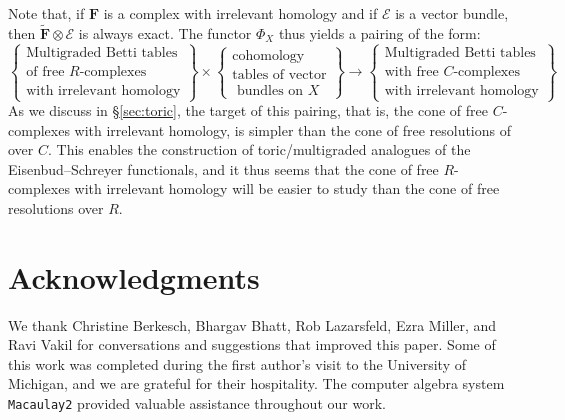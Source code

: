 \documentclass[12pt]{amsart}
\theoremstyle{definition}
\theoremstyle{remark}
\newcommand{\cE}{\mathcal{E}}
\newcommand{\FF}{\mathbf{F}}
\begin{document}
Note that, if  $\FF$ is a complex with irrelevant homology and if $\cE$ is a vector bundle, then $\widetilde{\FF}\otimes \cE$ is always exact.
The functor $\Phi_{X}$ thus yields a pairing of the form:
\begin{equation*}%
\label{eqn:multipairing}
%
\left\{\begin{matrix}
\text{Multigraded Betti tables} \\ \text{of free $R$-complexes}\\
\text{with irrelevant homology}\end{matrix}\right\}
%
\times 
%
\left\{\begin{matrix}
\text{cohomology }\\
\text{tables of vector}\\
\text{ bundles on } X
\end{matrix}\right\}
%
\longrightarrow
\left\{\begin{matrix}
\text{Multigraded Betti tables} \\ \text{with  free $C$-complexes}\\
\text{with irrelevant homology}
\end{matrix}\right\}
\end{equation*}
As we discuss in \S\ref{sec:toric}, the target of this pairing, that is, the cone of free $C$-complexes with irrelevant homology, is simpler than the cone of free resolutions of over $C$.  This enables the construction of toric/multigraded analogues of the Eisenbud--Schreyer functionals, and it thus seems that the cone of free $R$-complexes with irrelevant homology will be easier to study than the cone of free resolutions over $R$. 

\section*{Acknowledgments}
We thank Christine Berkesch, Bhargav Bhatt, Rob Lazarsfeld, Ezra Miller, and Ravi Vakil for conversations and suggestions that improved this paper.
Some of this work was completed during the first author's visit to the University of Michigan, and we are grateful for their hospitality.  The computer
algebra system \texttt{Macaulay2} \cite{M2} provided valuable assistance throughout our work.
\end{document}
